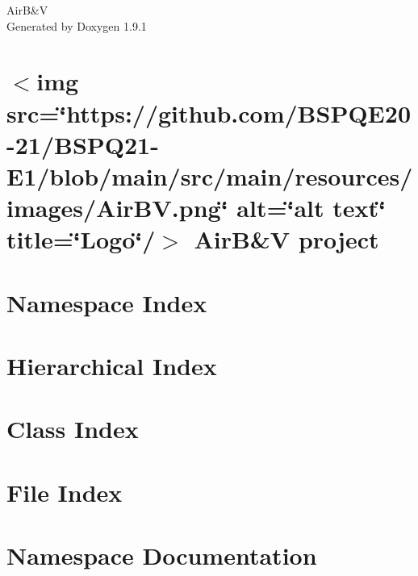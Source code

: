 \let\mypdfximage\pdfximage\def\pdfximage{\immediate\mypdfximage}\documentclass[twoside]{book}
\newcommand{\+}{\discretionary{\mbox{\scriptsize$\hookleftarrow$}}{}{}}
\newcommand{\clearemptydoublepage}{%
  \newpage{\pagestyle{empty}\cleardoublepage}%
}
\begin{document}
\raggedbottom

\hypersetup{pageanchor=false,
             bookmarksnumbered=true,
             pdfencoding=unicode
            }
\begin{titlepage}
\vspace*{7cm}
\begin{center}%
{\Large AirB\&V }\\
\vspace*{1cm}
{\large Generated by Doxygen 1.9.1}\\
\end{center}
\end{titlepage}
\clearemptydoublepage
{}
\tableofcontents
\clearemptydoublepage
{}
\hypersetup{pageanchor=true}

\chapter{$<$img src=\char`\"{}https\+://github.\+com/\+BSPQE20-\/21/\+BSPQ21-\/\+E1/blob/main/src/main/resources/images/\+Air\+BV.\+png\char`\"{} alt=\char`\"{}alt text\char`\"{} title=\char`\"{}\+Logo\char`\"{}/$>$ AirB\&V project}
\label{index}\hypertarget{index}{}
\chapter{Namespace Index}

\chapter{Hierarchical Index}

\chapter{Class Index}

\chapter{File Index}

\chapter{Namespace Documentation}










\end{document}
